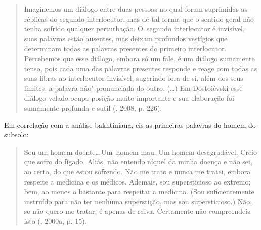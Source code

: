 \begin{quote}
Imaginemos um diálogo entre duas pessoas no qual foram suprimidas as
réplicas do segundo interlocutor, mas de tal forma que o sentido geral
não tenha sofrido qualquer perturbação. O~segundo interlocutor é
invisível, suas palavras estão ausentes, mas deixam profundos vestígios
que determinam todas as palavras presentes do primeiro interlocutor.
Percebemos que esse diálogo, embora só um fale, é um diálogo sumamente
tenso, pois cada uma das palavras presentes responde e reage com todas
as suas fibras ao interlocutor invisível, sugerindo fora de si, além dos
seus limites, a palavra não"-pronunciada do outro. (\ldots) Em Dostoiévski
esse diálogo velado ocupa posição muito importante e sua elaboração foi
sumamente profunda e sutil (, 2008, p. 226).
\end{quote}

Em correlação com a análise bakhtiniana, eis as primeiras palavras do
homem do subsolo:

\begin{quote}
Sou um homem doente\ldots \,Um~homem mau. Um homem desagradável. Creio que
sofro do fígado. Aliás, não entendo níquel da minha doença e não sei, ao
certo, do que estou sofrendo. Não me trato e nunca me tratei, embora
respeite a medicina e os médicos. Ademais, sou supersticioso ao extremo;
bem, ao menos o bastante para respeitar a medicina. (Sou suficientemente
instruído para não ter nenhuma superstição, mas sou supersticioso.) Não,
se não quero me tratar, é apenas de raiva. Certamente não compreendeis
isto (, 2000a, p. 15).
\end{quote}

